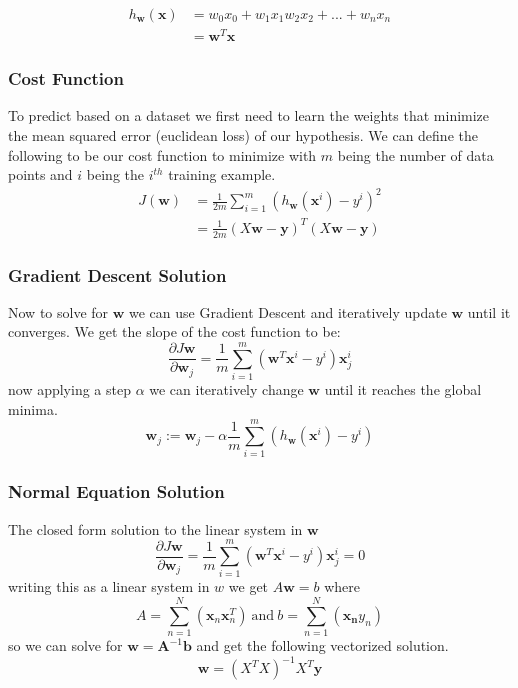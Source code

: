 \documentclass[12pt]{article}
\begin{document}
        \begin{align*}
            h_{\boldsymbol{w}}(\boldsymbol{x}) &= w_0x_0 + w_1x_1 w_2x_2 + ... + w_nx_n \\
            &= \boldsymbol{w}^T\boldsymbol{x}
        \end{align*}

    \subsubsection{Cost Function}
        To predict based on a dataset we first need to learn the weights that minimize the mean squared error (euclidean loss) of our hypothesis. We can define the following to be our cost function to
        minimize with $m$ being the number of data points and $i$ being the $i^{th}$ training example.
        \begin{align*}
            J(\boldsymbol{w}) &= \frac{1}{2m}\sum_{i=1}^{m}(h_{\boldsymbol{w}}(\boldsymbol{x}^i) - y^i)^2 \\
            &= \frac{1}{2m}(X\boldsymbol{w} - \boldsymbol{y})^T(X\boldsymbol{w} - \boldsymbol{y})
        \end{align*}


    \subsubsection{Gradient Descent Solution}
        Now to solve for $\boldsymbol{w}$ we can use Gradient Descent and iteratively update $\boldsymbol{w}$ until it converges. We get the slope of the cost function to be:
        $$ \frac{\partial J{\boldsymbol{w}}}{\partial \boldsymbol{w}_j} = \frac{1}{m}\sum_{i=1}^m(\boldsymbol{w}^T\boldsymbol{x}^{i}-y^{i})\boldsymbol{x}_{j}^i $$
        now applying a step $\alpha$ we can iteratively change $\boldsymbol{w}$ until it reaches the global minima. 
        $$ \boldsymbol{w}_j := \boldsymbol{w}_j - \alpha \frac{1}{m}\sum_{i=1}^{m}(h_{\boldsymbol{w}}(\boldsymbol{x}^i) - y^i) $$

    \subsubsection{Normal Equation Solution}
        The closed form solution to the linear system in $\boldsymbol{w}$
        $$ \frac{\partial J{\boldsymbol{w}}}{\partial \boldsymbol{w}_j} = \frac{1}{m}\sum_{i=1}^m(\boldsymbol{w}^T\boldsymbol{x}^{i}-y^{i})\boldsymbol{x}_{j}^i = 0 $$
        writing this as a linear system in $w$ we get $A\boldsymbol{w} = b$ where
        $$ A = \sum_{n=1}^N(\boldsymbol{x}_n \boldsymbol{x}_n^T) \ \textrm{and} \ b = \sum_{n=1}^N(\boldsymbol{x_n} y_n) $$
        so we can solve for $\boldsymbol{w} = \boldsymbol{A}^{-1}\boldsymbol{b}$ and get the following vectorized solution.
        $$ \boldsymbol{w} = (X^TX)^{-1}X^T\boldsymbol{y} $$
    
\end{document}
